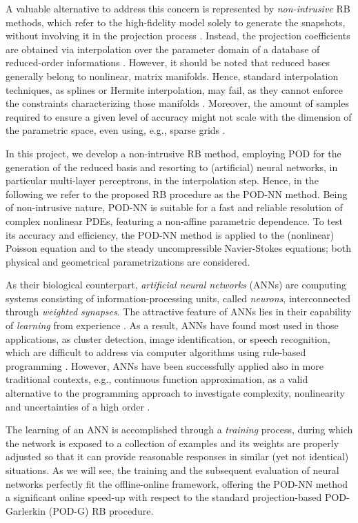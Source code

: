 \documentclass[12pt, a4paper, twoside, openright, notitlepage]{report}
\numberwithin{equation}{chapter}
\theoremstyle{theorem}
\theoremstyle{definition}
\theoremstyle{remark}
\theoremstyle{proposition}
\numberwithin{figure}{chapter}
\begin{document}
		A valuable alternative to address this concern is represented by \emph{non-intrusive} RB methods, which refer to the high-fidelity model solely to generate the snapshots, without involving it in the projection process \cite{Chen17}. Instead, the projection coefficients are obtained via interpolation over the parameter domain of a database of reduced-order informations \cite{Cas15}. However, it should be noted that reduced bases generally belong to nonlinear, matrix manifolds. Hence, standard interpolation techniques, as splines \cite{Deb78} or Hermite \cite{Deb87} interpolation, may fail, as they cannot enforce the constraints characterizing those manifolds \cite{Ams10}. Moreover, the amount of samples required to ensure a given level of accuracy might not scale with the dimension of the parametric space, even using, e.g., sparse grids \cite{BNR00}. 
		
		In this project, we develop a non-intrusive RB method, employing POD for the generation of the reduced basis and resorting to (artificial) neural networks, in particular multi-layer perceptrons, in the interpolation step. Hence, in the following we refer to the proposed RB procedure as the POD-NN method. Being of non-intrusive nature, POD-NN is suitable for a fast and reliable resolution of complex nonlinear PDEs, featuring a non-affine parametric dependence. To test its accuracy and efficiency, the POD-NN method is applied to the (nonlinear) Poisson equation and to the steady uncompressible Navier-Stokes equations; both physical and geometrical parametrizations are considered.
		
		As their biological counterpart, \emph{artificial neural networks} (ANNs) \cite{Hay05} are computing systems consisting of information-processing units, called \emph{neurons}, interconnected through \emph{weighted synapses}. The attractive feature of ANNs lies in their capability of \emph{learning} from experience \cite{Kri07}. As a result, ANNs have found most used in those applications, as cluster detection, image identification, or speech recognition, which are difficult to address via computer algorithms using rule-based programming \cite{Mat16}. However, ANNs have been successfully applied also in more traditional contexts, e.g., continuous function approximation, as a valid alternative to the programming approach to investigate complexity, nonlinearity and uncertainties of a high order \cite{Nie15}. 
		
		The learning of an ANN is accomplished through a \emph{training} process, during which the network is exposed to a collection of examples and its weights are properly adjusted so that it can provide reasonable responses in similar (yet not identical) situations. As we will see, the training and the subsequent evaluation of neural networks perfectly fit the offline-online framework, offering the POD-NN method a significant online speed-up with respect to the standard projection-based POD-Garlerkin (POD-G) RB procedure.
		
\end{document}
